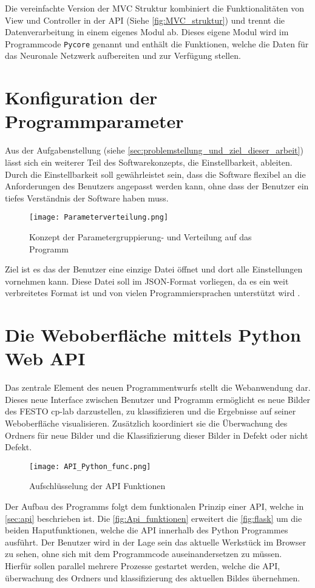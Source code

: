 Die vereinfachte Version der \ac{MVC} Struktur kombiniert die Funktionalitäten von View und Controller in der \ac{API} (Siehe \autoref{fig:MVC_struktur}) und trennt die Datenverarbeitung in einem eigenes Modul ab. Dieses eigene Modul wird im Programmcode \texttt{Pycore} genannt und enthält die Funktionen, welche die Daten für das Neuronale Netzwerk aufbereiten und zur Verfügung stellen.

\section{Konfiguration der Programmparameter} \label{sec:konfiguration}

Aus der Aufgabenstellung (siehe \autoref{sec:problemstellung_und_ziel_dieser_arbeit}) lässt sich ein weiterer Teil des Softwarekonzepts, die Einstellbarkeit, ableiten.
Durch die Einstellbarkeit soll gewährleistet sein, dass die Software flexibel an die Anforderungen des Benutzers angepasst werden kann, ohne dass der Benutzer ein tiefes Verständnis der Software haben muss.

\begin{figure}[H]
    \centering
    \texttt{[image: Parameterverteilung.png]}
    \caption{Konzept der Parametergruppierung- und Verteilung auf das Programm} 
    \label{fig:json_example}
\end{figure}

Ziel ist es das der Benutzer eine einzige Datei öffnet und dort alle Einstellungen vornehmen kann. 
Diese Datei soll im \ac{JSON}-Format vorliegen, da es ein weit verbreitetes Format ist und von vielen Programmiersprachen unterstützt wird \cite{gur_diskussion_2024}.


\section{Die Weboberfläche mittels Python Web API} \label{sec:weboberflaeche}

Das zentrale Element des neuen Programmentwurfs stellt die Webanwendung dar. Dieses neue Interface zwischen Benutzer und Programm ermöglicht es neue Bilder des FESTO \ac{cp-lab} darzustellen, zu klassifizieren und die Ergebnisse auf seiner Weboberfläche visualisieren.
Zusätzlich koordiniert sie die Überwachung des Ordners für neue Bilder und die Klassifizierung dieser Bilder in Defekt oder nicht Defekt.

\begin{figure}[H]
    \centering
    \texttt{[image: API\_Python\_func.png]}
    \caption{Aufschlüsselung der API Funktionen} 
    \label{fig:Api_funktionen}
\end{figure}

Der Aufbau des Programms folgt dem funktionalen Prinzip einer \ac{API}, welche in \autoref{sec:api} beschrieben ist. Die \autoref{fig:Api_funktionen} erweitert die \autoref{fig:flask} um die beiden Haputfunktionen, welche die API innerhalb des Python Programmes ausführt. Der Benutzer wird in der Lage sein das aktuelle Werkstück im Browser zu sehen, ohne sich mit dem Programmcode auseinandersetzen zu müssen. Hierfür sollen parallel mehrere Prozesse gestartet werden, welche die API, überwachung des Ordners und klassifizierung des aktuellen Bildes übernehmen.